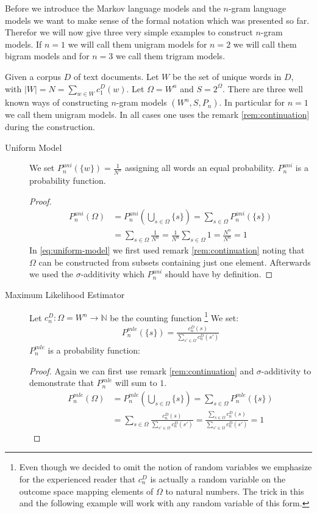 \documentclass[•]{book}
\begin{document}
Before we introduce the Markov language models and the $n$-gram language models we want to make sense of the formal notation which was presented so far.
Therefor we will now give three very simple examples to construct $n$-gram models. If $n=1$ we will call them unigram models for $n=2$ we will call them bigram models and for $n=3$ we call them trigram models. 

\begin{example}\label{ex:unigram-model}
Given a corpus $D$ of text documents. Let $W$ be the set of unique words in $D$, with $|W|=N=\sum_{w\in W}c_1^D(w)$. Let $\Omega=W^n$ and $S=2^{\Omega}$. There are three well known ways of constructing $n$-gram models $(W^n,S,P_n)$. In particular for $n=1$ we call them unigram models. In all cases one uses the remark \ref{rem:continuation} during the construction. 
\begin{description}
\item[Uniform Model] We set $P_n^{uni}(\{w\})=\frac{1}{N^n}$ assigning all words an equal probability.  $P_n^{uni}$ is a probability function. 
\begin{proof}
\begin{align}
P_n^{uni}(\Omega) & = P_n^{uni}(\bigcup_{s\in\Omega}\{s\}) = \sum\limits_{s\in\Omega}P_n^{uni}(\{s\}) \label{eq:uniform-model}\\
 &  = \sum\limits_{s\in\Omega}\frac{1}{N^n}  =  \frac{1}{N^n} \sum\limits_{s\in\Omega}1= \frac{N^n}{N^n} = 1 
\end{align}
In \ref{eq:uniform-model} we first used remark \ref{rem:continuation} noting that $\Omega$ can be constructed from subsets containing just one element. 
Afterwards we used the $\sigma$-additivity which $P_n^{uni}$ should have by definition. 
\end{proof}

\item[Maximum Likelihood Estimator]  Let $c_n^D:\Omega = W^n\longrightarrow\mathbb{N}$ be the counting function \footnote{Even though we decided to omit the notion of random variables we emphasize for the experienced reader that $c_n^D$ is actually a random variable on the outcome space mapping elements of $\Omega$ to natural numbers. The trick in this and the following example will work with any random variable of this form.} We set: 
\begin{align}
P_n^{mle}(\{s\})=\frac{c_n^D(s)}{\sum\limits_{s'\in \Omega}c_n^D(s')} \label{eq:n-grammodel:mle}
\end{align}
$P_n^{mle}$ is a probability function:
\begin{proof}
Again we can first use remark \ref{rem:continuation} and $\sigma$-additivity to demonstrate that $P_n^{mle}$ will sum to $1$. 
\begin{align}
P_n^{mle}(\Omega) & = P_n^{mle}(\bigcup_{s\in\Omega}\{s\}) = \sum\limits_{s\in\Omega}P_n^{mle}(\{s\} )  \\
& =  \sum\limits_{s\in\Omega} \frac{c_n^D(s)}{\sum\limits_{s'\in \Omega}c_n^D(s')} = \frac{\sum\limits_{s\in \Omega}c_n^D(s)}{\sum\limits_{s'\in \Omega}c_n^D(s')} = 1
\end{align}
\end{proof}


\end{description}
\end{example}
\end{document}

